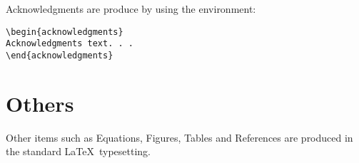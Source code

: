 \documentclass{clv3}
\begin{document}
Acknowledgments are produce by using the environment:
\\
\begin{verbatim}
\begin{acknowledgments}
Acknowledgments text. . .
\end{acknowledgments}
\end{verbatim}

\section{Others}

Other items such as Equations, Figures, Tables and References are produced in
the standard \LaTeX\ typesetting.

\starttwocolumn

\end{document}
